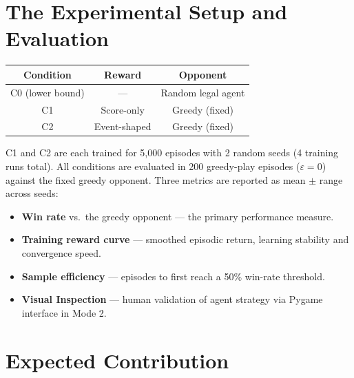 \documentclass[11pt]{article}
\begin{document}
\section{The Experimental Setup and Evaluation}

\begin{center}
\renewcommand{\arraystretch}{1.15}
\begin{tabular}{ccc}
\toprule
\textbf{Condition} & \textbf{Reward} & \textbf{Opponent} \\
\midrule
C0 (lower bound) & —             & Random legal agent \\
C1               & Score-only    & Greedy (fixed) \\
C2               & Event-shaped  & Greedy (fixed) \\
\bottomrule
\end{tabular}
\end{center}

\newpage

C1 and C2 are each trained for 5{,}000 episodes with 2 random seeds (4 training runs total).
All conditions are evaluated in 200 greedy-play episodes ($\varepsilon=0$) against the fixed
greedy opponent. Three metrics are reported as mean $\pm$ range across seeds:

\begin{itemize}
  \item \textbf{Win rate} vs.\ the greedy opponent — the primary performance measure.
  \item \textbf{Training reward curve} — smoothed episodic return, learning
        stability and convergence speed.
  \item \textbf{Sample efficiency} — episodes to first reach a 50\% win-rate threshold.
  \item \textbf{Visual Inspection} — human validation of agent strategy via Pygame interface in Mode 2.
\end{itemize}

\section{Expected Contribution}
\end{document}
